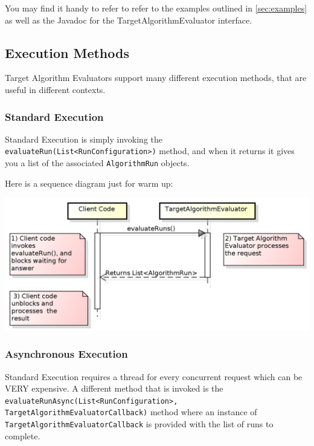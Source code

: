 \documentclass[11pt,letterpaper,oneside]{article}
\begin{document}
You may find it handy to refer to refer to the examples outlined in \ref{sec:examples} as well as the Javadoc for the TargetAlgorithmEvaluator interface.

\subsection{Execution Methods}

Target Algorithm Evaluators support many different execution methods, that are useful in different contexts.

\subsubsection{Standard Execution}

Standard Execution is simply invoking the \texttt{evaluateRun(List<RunConfiguration>)} method, and when it returns it gives you a list of the associated \texttt{AlgorithmRun} objects.

Here is a sequence diagram just for warm up:

\begin{center}
\includegraphics[scale=0.75]{img/UML/TAESequence1.png}
\end{center}

\subsubsection{Asynchronous Execution}

Standard Execution requires a thread for every concurrent request which can be VERY expensive. A different method that is invoked is the \texttt{evaluateRunAsync(List<RunConfiguration>, TargetAlgorithmEvaluatorCallback)} method where an instance of \texttt{TargetAlgorithmEvaluatorCallback} is provided with the list of runs to complete.
\end{document}

